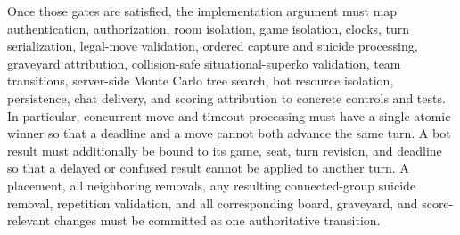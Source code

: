 \documentclass[11pt,oneside]{book}
\begin{document}
Once those gates are satisfied, the implementation argument must map authentication, authorization, room isolation, game isolation, clocks, turn serialization, legal-move validation, ordered capture and suicide processing, graveyard attribution, collision-safe situational-superko validation, team transitions, server-side Monte Carlo tree search, bot resource isolation, persistence, chat delivery, and scoring attribution to concrete controls and tests. In particular, concurrent move and timeout processing must have a single atomic winner so that a deadline and a move cannot both advance the same turn. A bot result must additionally be bound to its game, seat, turn revision, and deadline so that a delayed or confused result cannot be applied to another turn. A placement, all neighboring removals, any resulting connected-group suicide removal, repetition validation, and all corresponding board, graveyard, and score-relevant changes must be committed as one authoritative transition.
\end{document}
